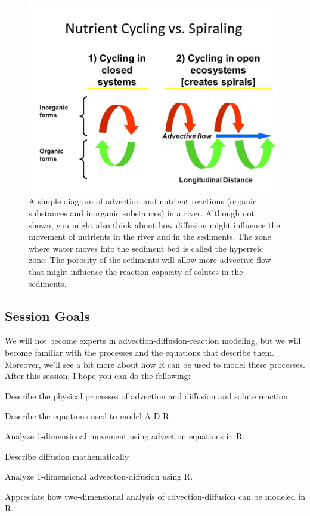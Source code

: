 \documentclass{tufte-handout}\usepackage[]{graphicx}\usepackage[]{xcolor}
\newenvironment{enumerate*}%
  {\begin{enumerate}%
    \setlength{\itemsep}{0pt}%
    \setlength{\parskip}{0pt}}%
  {\end{enumerate}}
\begin{document}
\begin{figure}
\caption{A simple diagram of advection and nutrient reactions (organic substances and inorganic substances) in a river. Although not shown, you might also think about how diffusion might influence the movement of nutrients in the river and in the sediments.  
The zone where water moves into the sediment bed is called the hyperreic zone. The porosity of the sediments will allow more advective flow that might influence the reaction capacity of solutes in the sediments.}
\label{fig:nutrientspiraling}
\centering
\includegraphics[width=0.99\textwidth]{graphics/NutrientSpiraling.jpg}
\end{figure}


\subsection{Session Goals}

We will not become experts in advection-diffusion-reaction modeling, but we will become familiar with the processes and the equations that describe them. Moreover, we'll see a bit more about how R can be used to model these processes. After this session, I hope you can do the following:

\begin{enumerate*}
	\item Describe the physical processes of advection and diffusion and solute reaction
	\item Describe the equations used to model A-D-R. 
	\item Analyze 1-dimensional movement using advection equations in R.
	\item Describe diffusion mathematically
	\item Analyze 1-dimensional adveecton-diffusion using R.
	\item Appreciate how two-dimensional analysis of advection-diffusion can be modeled in R.
\end{enumerate*}
\end{document}
